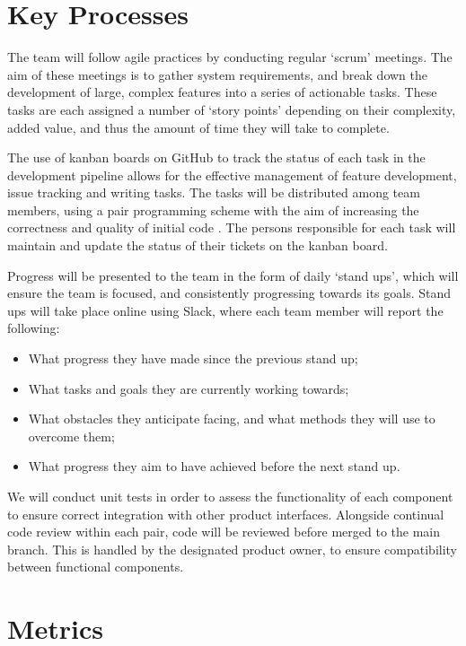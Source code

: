 \section{Key Processes}
The team will follow agile practices by conducting regular `scrum’ meetings. The aim of these meetings is to gather system requirements, and break down the development of large, complex features into a series of actionable tasks. These tasks are each assigned a number of `story points’ depending on their complexity, added value, and thus the amount of time they will take to complete.

The use of kanban boards on GitHub to track the status of each task in the development pipeline allows for the effective management of feature development, issue tracking and writing tasks. The tasks will be distributed among team members, using a pair programming scheme with the aim of increasing the correctness and quality of initial code \cite{hannay2009effectiveness}. The persons responsible for each task will maintain and update the status of their tickets on the kanban board.

Progress will be presented to the team in the form of daily `stand ups’, which will ensure the team is focused, and consistently progressing towards its goals. Stand ups will take place online using Slack, where each team member will report the following:

\begin{itemize}[noitemsep,topsep=0pt]
	\item What progress they have made since the previous stand up;
	\item What tasks and goals they are currently working towards;
	\item What obstacles they anticipate facing, and what methods they will use to overcome them;
	\item What progress they aim to have achieved before the next stand up.
\end{itemize}

We will conduct unit tests in order to assess the functionality of each component to ensure correct integration with other product interfaces. Alongside continual code review within each pair, code will be reviewed before merged to the main branch. This is handled by the designated product owner, to ensure compatibility between functional components.

\section{Metrics}
